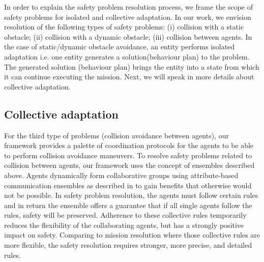 \documentclass[journal]{IEEEtran}
\theoremstyle{definition}
\newcommand\todo[1]{\nb{Todo}{#1}}
\begin{document}
In  order to  explain  the safety  problem  resolution  process,  we  frame the  scope  of safety problems  for isolated  and  collective  adaptation. 
In our work, we envision resolution of the following types of safety problems: (i) collision with a static obstacle; (ii) collision with a  dynamic obstacle; (iii) collision between agents.  In the case of static/dynamic obstacle avoidance, an entity performs isolated adaptation i.e. one entity generates a solution(behaviour plan) to the problem. The  generated  solution  (behaviour  plan)  brings the entity  into  a  state  from  which  it  can  continue  executing the  mission. 
 Next,  we  will  speak  in  more  details  about  collective adaptation.

\subsection{Collective adaptation}








For the third type of problems (collision avoidance between agents), our framework provides a palette of coordination protocols for the agents to be able to perform collision avoidance maneuvers. 
To resolve safety problems related to collision between agents, our framework uses the concept of ensembles described above.
Agents dynamically form collaborative groups using attribute-based communication ensembles as described in \todo{[reference needed]} to gain benefits that otherwise
would not be possible. In safety problem resolution, the agents must follow certain rules and in return the ensemble offers a guarantee that if all single agents follow the rules, safety will be preserved. Adherence to these collective
rules temporarily reduces the flexibility of the collaborating agents, but has a strongly positive impact on safety. Comparing to mission resolution where those collective rules are more flexible, the safety resolution requires stronger, more precise, and detailed rules. 
\end{document}
